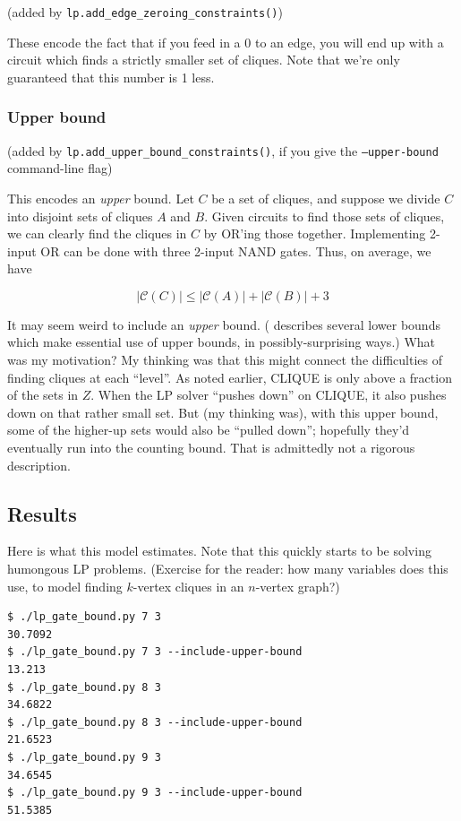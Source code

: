 \documentclass[12pt]{article}
\theoremstyle{definition}
\newcommand{\bigC}[0]{\mathcal{C}}
\begin{document}
(added by {\tt lp.add\_edge\_zeroing\_constraints()})

These encode the fact that if you feed in a 0 to an edge,
you will end up with a circuit which finds a strictly smaller
set of cliques. Note that we're only guaranteed that this
number is 1 less.

\subsubsection{Upper bound}

(added by {\tt lp.add\_upper\_bound\_constraints()}, if you give
the {\tt --upper-bound} command-line flag)

This encodes an {\em upper} bound.
Let $C$ be a set of cliques, and suppose we divide $C$ into
disjoint sets of cliques $A$ and $B$. Given circuits to
find those sets of cliques, we can clearly find the cliques
in $C$ by OR'ing those together. Implementing 2-input OR can be
done with three 2-input NAND gates. Thus, on average, we have

\[
|\bigC(C)| \le |\bigC(A)| + |\bigC(B)| + 3
\]

It may seem weird to include an {\em upper} bound.
(\cite{aaronson_pnp} describes several lower bounds which make
essential use of upper bounds, in possibly-surprising ways.)
 What was
my motivation? My thinking was that this might connect the difficulties
of finding cliques at each ``level''. As noted earlier, CLIQUE
is only above a fraction of the sets in $Z$. When the LP solver
``pushes down'' on CLIQUE, it also pushes down on that rather small
set. But (my thinking was), with this upper bound, some of the
higher-up sets would also be ``pulled down''; hopefully they'd
eventually run into the counting bound. That is admittedly
not a rigorous description.

\subsection{Results}

Here is what this model estimates. Note that this quickly starts
to be solving humongous LP problems. (Exercise for the reader:
how many variables does this use, to model finding $k$-vertex
cliques in an $n$-vertex graph?)

\begin{verbatim}
$ ./lp_gate_bound.py 7 3
30.7092
$ ./lp_gate_bound.py 7 3 --include-upper-bound
13.213
$ ./lp_gate_bound.py 8 3
34.6822
$ ./lp_gate_bound.py 8 3 --include-upper-bound
21.6523
$ ./lp_gate_bound.py 9 3
34.6545
$ ./lp_gate_bound.py 9 3 --include-upper-bound
51.5385
\end{verbatim}
\end{document}
